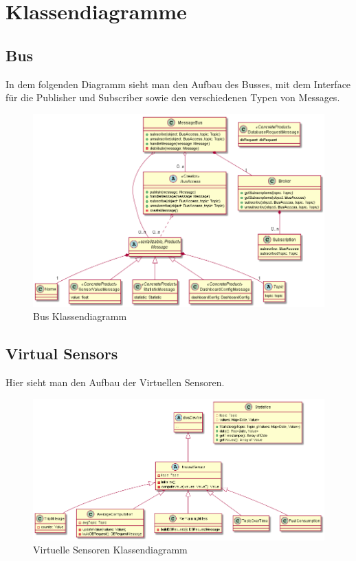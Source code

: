 \documentclass[entwurf.tex]{subfiles}
\begin{document}
\chapter{Klassendiagramme}
	\section{Bus}
		In dem folgenden Diagramm sieht man den Aufbau des Busses, mit dem Interface für die Publisher und Subscriber sowie den verschiedenen Typen von Messages.
		\begin{figure}[H]
  			\begin{center}
 				\includegraphics[width=\textwidth]{diagrams/Bus.png}
  				\caption{Bus Klassendiagramm}
  			\end{center}
  		\end{figure}
  		
  	
  	\newpage
  	\section{Virtual Sensors}
		Hier sieht man den Aufbau der Virtuellen Sensoren.
		\begin{figure}[H]
  			\begin{center}
 				\includegraphics[width=\textwidth]{diagrams/VirtualSensors.png}
  				\caption{Virtuelle Sensoren Klassendiagramm}
  			\end{center}
  		\end{figure}
  	
\end{document}
